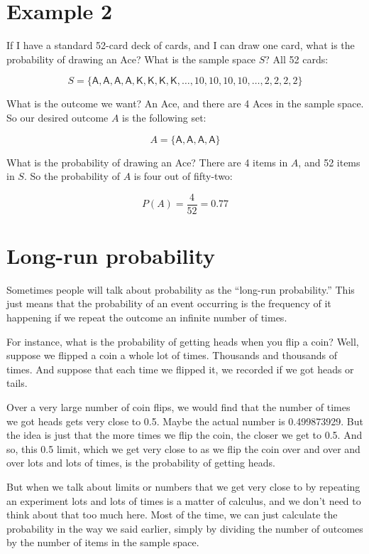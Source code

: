 \documentclass[../../../main.tex]{subfiles}
\begin{document}
\section{Example 2}

If I have a standard 52-card deck of cards, and I can draw one card, what is the probability of drawing an Ace? What is the sample space $S$? All 52 cards:

\begin{equation*}
  S = \{ \mathsf{A, A, A, A, K, K, K, K,} \ldots, 10, 10, 10, 10, \ldots, 2, 2, 2, 2 \}
\end{equation*}

\noindent
What is the outcome we want? An Ace, and there are 4 Aces in the sample space. So our desired outcome $A$ is the following set:

\begin{equation*}
  A = \{ \mathsf{A, A, A, A} \}
\end{equation*}

\noindent
What is the probability of drawing an Ace? There are 4 items in $A$, and 52 items in $S$. So the probability of $A$ is four out of fifty-two:

\begin{equation*}
  P(A) = \frac{4}{52} = 0.77
\end{equation*}


\section{Long-run probability}

Sometimes people will talk about probability as the ``long-run probability.'' This just means that the probability of an event occurring is the frequency of it happening if we repeat the outcome an infinite number of times. 

For instance, what is the probability of getting heads when you flip a coin? Well, suppose we flipped a coin a whole lot of times. Thousands and thousands of times. And suppose that each time we flipped it, we recorded if we got heads or tails. 

Over a very large number of coin flips, we would find that the number of times we got heads gets very close to 0.5. Maybe the actual number is 0.499873929. But the idea is just that the more times we flip the coin, the closer we get to 0.5. And so, this 0.5 limit, which we get very close to as we flip the coin over and over and over lots and lots of times, is the probability of getting heads.

But when we talk about limits or numbers that we get very close to by repeating an experiment lots and lots of times is a matter of calculus, and we don't need to think about that too much here. Most of the time, we can just calculate the probability in the way we said earlier, simply by dividing the number of outcomes by the number of items in the sample space. 
\end{document}

